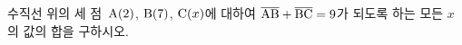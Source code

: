 수직선 위의 세 점~$\mathrm{A}(2)$, $\mathrm{B}(7)$, $\mathrm{C}(x)$에 대하여 $\overline{\mathrm{AB}}+\overline{\mathrm{BC}}=9$가 되도록 하는 모든 $x$의 값의 합을 구하시오.
